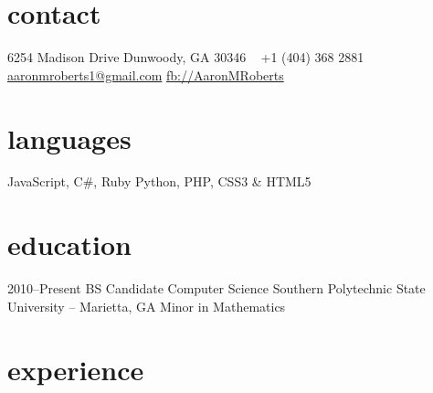 \documentclass[]{friggeri-cv} %
\begin{document}


\begin{aside} %
\section{contact}
6254 Madison Drive
Dunwoody, GA 30346
~
+1 (404) 368 2881
~
\href{mailto:aaronmroberts1@gmail.com}{aaronmroberts1@gmail.com}
\href{https://www.facebook.com/AaronMRoberts}{fb://AaronMRoberts}
\section{languages}
JavaScript, C\#, Ruby
Python, PHP, 
CSS3 \& HTML5
\end{aside}


\section{education}

\begin{entrylist}
\entry
{2010--Present}
{BS Candidate {\normalfont Computer Science}}
{Southern Polytechnic State University -- Marietta, GA }
{Minor in Mathematics}
\end{entrylist}


\section{experience}
\end{document}
